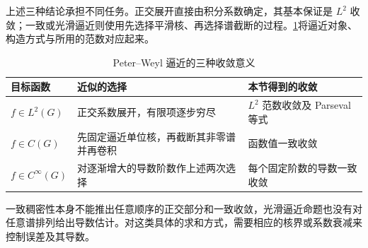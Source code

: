 上述三种结论承担不同任务。正交展开直接由积分系数确定，其基本保证是 \(L^2\) 收敛；一致或光滑逼近则使用先选择平滑核、再选择谱截断的过程。\cref{g1:tab:peter-weyl-convergence}将逼近对象、构造方式与所用的范数对应起来。
\begin{table}[htbp]
	\centering
	\caption{Peter--Weyl 逼近的三种收敛意义}
	\label{g1:tab:peter-weyl-convergence}
	\begin{tabularx}{\textwidth}{@{}lXX@{}}
		\toprule
		目标函数 & 近似的选择 & 本节得到的收敛\\
		\midrule
		\(f\in L^2(G)\) & 正交系数展开，有限项逐步穷尽 & \(L^2\) 范数收敛及 Parseval 等式\\
		\(f\in C(G)\) & 先固定逼近单位核，再截断其非零谱并再卷积 & 函数值一致收敛\\
		\(f\in C^\infty(G)\) & 对逐渐增大的导数阶数作上述两次选择 & 每个固定阶数的导数一致收敛\\
		\bottomrule
	\end{tabularx}
\end{table}
一致稠密性本身不能推出任意顺序的正交部分和一致收敛，光滑逼近命题也没有对任意谱排列给出导数估计。对这类具体的求和方式，需要相应的核界或系数衰减来控制误差及其导数。
